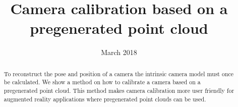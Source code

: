 \documentclass[conference]{IEEEtran}
\begin{document}
\title{Camera calibration based on a pregenerated point cloud}

\author{
}
\date{March 2018}
\maketitle
\begin{abstract}
    To reconstruct the pose and position of a camera the intrinsic camera model must once be calculated. We show a method on how to calibrate a camera based on a pregenerated point cloud. This method makes camera calibration more user friendly for augmented reality applications where pregenerated point clouds can be used.
\end{abstract}
\IEEEpeerreviewmaketitle
\end{document}
